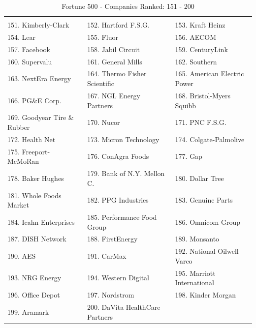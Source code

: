 \documentclass{book}
\begin{document}
\begin{table}[H]
\centering
\caption{Fortune 500 - Companies Ranked: 151 - 200}
\begin{tabular}{lll}
\hline
 \\ 151. Kimberly-Clark 
&  152. Hartford F.S.G. 
&  153. Kraft Heinz 
\\ 154. Lear 
&  155. Fluor 
&  156. AECOM 
\\ 157. Facebook 
&  158. Jabil Circuit 
&  159. CenturyLink 
\\ 160. Supervalu 
&  161. General Mills 
&  162. Southern 
\\ 163. NextEra Energy 
&  164. Thermo Fisher Scientific 
&  165. American Electric Power 
\\ 166. PG\&E Corp. 
&  167. NGL Energy Partners 
&  168. Bristol-Myers Squibb 
\\ 169. Goodyear Tire \& Rubber 
&  170. Nucor 
&  171. PNC F.S.G. 
\\ 172. Health Net 
&  173. Micron Technology 
&  174. Colgate-Palmolive 
\\ 175. Freeport-McMoRan 
&  176. ConAgra Foods 
&  177. Gap 
\\ 178. Baker Hughes 
&  179. Bank of N.Y. Mellon C. 
&  180. Dollar Tree 
\\ 181. Whole Foods Market 
&  182. PPG Industries 
&  183. Genuine Parts 
\\ 184. Icahn Enterprises 
&  185. Performance Food Group 
&  186. Omnicom Group 
\\ 187. DISH Network 
&  188. FirstEnergy 
&  189. Monsanto 
\\ 190. AES 
&  191. CarMax 
&  192. National Oilwell Varco 
\\ 193. NRG Energy 
&  194. Western Digital 
&  195. Marriott International 
\\ 196. Office Depot 
&  197. Nordstrom 
&  198. Kinder Morgan 
\\ 199. Aramark 
&  200. DaVita HealthCare Partners 
&   
 \\ \hline
\end{tabular}
\end{table}
\end{document}
